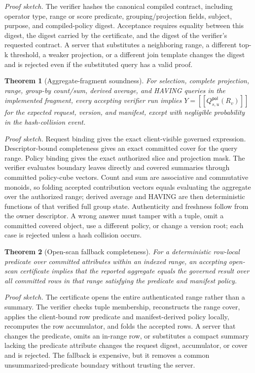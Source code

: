 \documentclass[conference]{IEEEtran}
\newcommand{\qsem}[1]{[\![#1]\!]}
\newcommand{\pol}{\mathsf{pol}}
\newtheorem{theorem}{Theorem}
\begin{document}
\noindent\emph{Proof sketch.} The verifier hashes the canonical compiled contract, including operator type, range or score predicate, grouping/projection fields, subject, purpose, and compiled-policy digest. Acceptance requires equality between this digest, the digest carried by the certificate, and the digest of the verifier's requested contract. A server that substitutes a neighboring range, a different top-k threshold, a weaker projection, or a different join template changes the digest and is rejected even if the substituted query has a valid proof.

\begin{theorem}[Aggregate-fragment soundness]
For selection, complete projection, range, group-by count/sum, derived average, and HAVING queries in the implemented fragment, every accepting verifier run implies $Y=\qsem{Q^{\pol}_{s,u}(R_v)}$ for the expected request, version, and manifest, except with negligible probability in the hash-collision event.
\end{theorem}

\noindent\emph{Proof sketch.} Request binding gives the exact client-visible governed expression. Descriptor-bound completeness gives an exact committed cover for the query range. Policy binding gives the exact authorized slice and projection mask. The verifier evaluates boundary leaves directly and covered summaries through committed policy-cube vectors. Count and sum are associative and commutative monoids, so folding accepted contribution vectors equals evaluating the aggregate over the authorized range; derived average and HAVING are then deterministic functions of that verified full group state. Authenticity and freshness follow from the owner descriptor. A wrong answer must tamper with a tuple, omit a committed covered object, use a different policy, or change a version root; each case is rejected unless a hash collision occurs.

\begin{theorem}[Open-scan fallback completeness]
For a deterministic row-local predicate over committed attributes within an indexed range, an accepting open-scan certificate implies that the reported aggregate equals the governed result over all committed rows in that range satisfying the predicate and manifest policy.
\end{theorem}

\noindent\emph{Proof sketch.} The certificate opens the entire authenticated range rather than a summary. The verifier checks tuple membership, reconstructs the range cover, applies the client-bound row predicate and manifest-derived policy locally, recomputes the row accumulator, and folds the accepted rows. A server that changes the predicate, omits an in-range row, or substitutes a compact summary lacking the predicate attribute changes the request digest, accumulator, or cover and is rejected. The fallback is expensive, but it removes a common unsummarized-predicate boundary without trusting the server.
\end{document}
